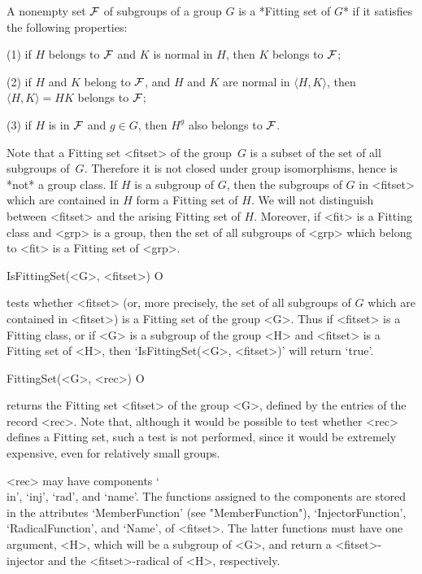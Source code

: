 \null


A nonempty set $\cal F$ of subgroups of a group $G$ is a *Fitting set of
$G$*  if it satisfies the following properties:

\beginlist
\item{(1)} if $H$ belongs to $\cal F$ and $K$ is normal in $H$, then $K$ 
           belongs to $\cal F$;
         
\item{(2)} if $H$ and $K$ belong to $\cal F$, and $H$ and $K$ are normal in
$\langle H, K \rangle$, then $\langle H, K \rangle = H K$ belongs to $\cal
F$;
         
\item{(3)} if $H$ is in $\cal F$ and $g \in G$, then $H^g$ also belongs to 
           $\cal F$.
\endlist

Note that a Fitting set <fitset> of the group~$G$ is a subset of the set of all
subgroups of~$G$. Therefore it is not closed under group
isomorphisms, hence  is *not* a group class. If $H$ is a subgroup of $G$, then the
subgroups of $G$ in <fitset> which are contained in $H$ form a Fitting set of $H$.
We will not distinguish between <fitset> and the arising Fitting set of $H$. 
Moreover, if  <fit> is a Fitting class and <grp> is a group, then the set of all
subgroups of <grp> which belong to <fit> is a Fitting set of <grp>.

\>IsFittingSet(<G>, <fitset>) O

tests whether <fitset> (or, more precisely, the set of all subgroups of $G$
which are contained in  <fitset>) is a Fitting set of the group <G>. Thus if
<fitset> is a Fitting class, or if
<G> is a subgroup of the group <H> and <fitset> is a Fitting set of <H>,
then `IsFittingSet(<G>, <fitset>)' will return `true'.

\>FittingSet(<G>, <rec>) O

returns the Fitting set <fitset> of the group <G>, defined by the entries of the
record <rec>. Note that, although it would be possible to test whether <rec> 
defines a Fitting set, such a test
is not performed, since it would be extremely expensive, even for relatively
small groups.

<rec> may have components `\\in', `inj', `rad', and `name'. The
functions assigned to the components are stored in the attributes
`MemberFunction' (see "MemberFunction"), `InjectorFunction', 
`RadicalFunction', and `Name', of <fitset>. The latter functions must have one
argument, <H>, which will be a subgroup of <G>, and return a
<fitset>-injector and the <fitset>-radical of <H>, respectively. 

